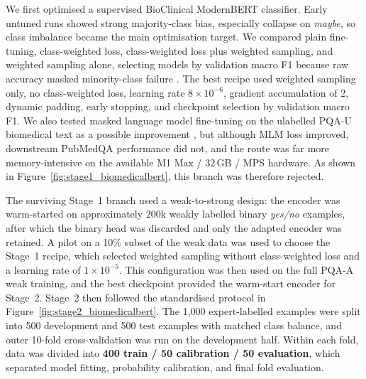 \documentclass{article}
\begin{document}
We first optimised a supervised BioClinical ModernBERT classifier. Early untuned runs showed strong majority-class bias, especially collapse on \textit{maybe}, so class imbalance became the main optimisation target. We compared plain fine-tuning, class-weighted loss, class-weighted loss plus weighted sampling, and weighted sampling alone, selecting models by validation macro F1 because raw accuracy masked minority-class failure \citep{Younes2022}. The best recipe used weighted sampling only, no class-weighted loss, learning rate $8\times10^{-6}$, gradient accumulation of 2, dynamic padding, early stopping, and checkpoint selection by validation macro F1. We also tested masked language model fine-tuning on the ulabelled PQA-U biomedical text as a possible improvement \citep{Gururangan2020}, but although MLM loss improved, downstream PubMedQA performance did not, and the route was far more memory-intensive on the available M1 Max / 32\,GB / MPS hardware. As shown in Figure~\ref{fig:stage1_biomedicalbert}, this branch was therefore rejected.

The surviving Stage~1 branch used a weak-to-strong design: the encoder was warm-started on approximately 200k weakly labelled binary \textit{yes/no} examples, after which the binary head was discarded and only the adapted encoder was retained. A pilot on a 10\% subset of the weak data was used to choose the Stage~1 recipe, which selected weighted sampling without class-weighted loss and a learning rate of $1\times10^{-5}$. This configuration was then used on the full PQA-A weak training, and the best checkpoint provided the warm-start encoder for Stage~2. Stage~2 then followed the standardised protocol in Figure~\ref{fig:stage2_biomedicalbert}. The 1,000 expert-labelled examples were split into 500 development and 500 test examples with matched class balance, and outer 10-fold cross-validation was run on the development half. Within each fold, data was divided into \textbf{400 train / 50 calibration / 50 evaluation}, which separated model fitting, probability calibration, and final fold evaluation.
\end{document}
